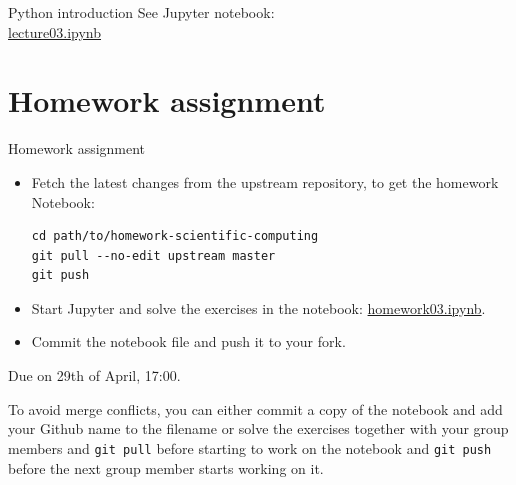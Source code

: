 \begin{frame}[fragile]{Python introduction}
    See Jupyter notebook:\\
    \href{https://github.com/inwe-boku/lecture-scientific-computing/blob/master/lecture03-python-introduction/lecture03.ipynb}{lecture03.ipynb}
\end{frame}


\section{Homework assignment}


\begin{frame}[fragile]{Homework assignment}
	\begin{itemize}
		\item Fetch the latest changes from the upstream repository, to get the homework Notebook:
            {\scriptsize
            \begin{verbatim}
cd path/to/homework-scientific-computing
git pull --no-edit upstream master
git push\end{verbatim}
            }
        \item Start Jupyter and solve the exercises in the notebook:
            \href{https://github.com/inwe-boku/homework-scientific-computing/blob/master/homework03-python-introduction/homework03.ipynb}{homework03.ipynb}.
        \item Commit the notebook file and push it to your fork.
	\end{itemize}

    \bigskip
    Due on 29th of April, 17:00.

    \bigskip
    To avoid merge conflicts, you can either commit a copy of the notebook and add your Github name
    to the filename or solve the exercises together with your group members and \verb|git pull|
    before starting to work on the notebook and \verb|git push| before the next group member starts
    working on it.
\end{frame}


